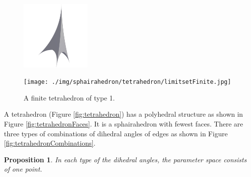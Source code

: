 \documentclass[suppldata, dvipdfmx]{interact}
\theoremstyle{plain}%
\newtheorem{proposition}[theorem]{Proposition}
\theoremstyle{definition}
\theoremstyle{remark}
\theoremstyle{problemstyle}
\begin{document}
\begin{figure}[h!tbp]
  \begin{minipage}[t]{0.49\textwidth}
   \centering
   \includegraphics[width=1.35in, height=1.35in, keepaspectratio]{./img/sphairahedron/tetrahedron/sphairahedronFinite.jpg}
   \label{fig:tetrahedronFiniteSphairahedron}
  \end{minipage}
  \hspace*{\fill}
  \begin{minipage}[t]{0.49\textwidth}
   \centering
   \texttt{[image: ./img/sphairahedron/tetrahedron/limitsetFinite.jpg]}
   \label{fig:tetrahedronFiniteLimitset}
  \end{minipage}
  \hspace*{\fill}
  \caption{A finite tetrahedron of type 1.}
  \label{fig:tetrahedronFinite}
\end{figure}

A tetrahedron (Figure \ref{fig:tetrahedron}) has a polyhedral structure as shown in Figure \ref{fig:tetrahedronFaces}.  It is a sphairahedron with fewest faces.
There are three types of combinations of dihedral angles of edges as shown in
Figure \ref{fig:tetrahedronCombinations}.

\begin{proposition}\label{prop:paraSpace_Tetrahedron}
In each type of the dihedral angles, the parameter space consists of one point.
\end{proposition}
\end{document}
